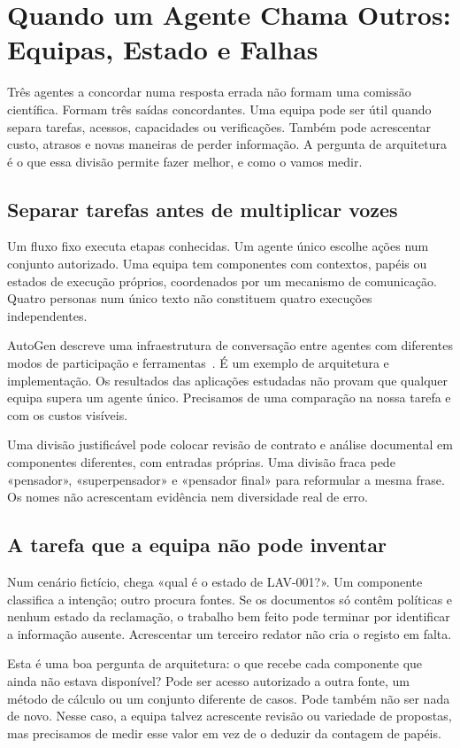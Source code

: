 \chapter{Quando um Agente Chama Outros: Equipas, Estado e Falhas}
\label{ch:multiagente}

Três agentes a concordar numa resposta errada não formam uma comissão científica. Formam três saídas concordantes. Uma equipa pode ser útil quando separa tarefas, acessos, capacidades ou verificações. Também pode acrescentar custo, atrasos e novas maneiras de perder informação. A pergunta de arquitetura é o que essa divisão permite fazer melhor, e como o vamos medir.

\section{Separar tarefas antes de multiplicar vozes}
Um fluxo fixo executa etapas conhecidas. Um agente único escolhe ações num conjunto autorizado. Uma equipa tem componentes com contextos, papéis ou estados de execução próprios, coordenados por um mecanismo de comunicação. Quatro personas num único texto não constituem quatro execuções independentes.

AutoGen descreve uma infraestrutura de conversação entre agentes com diferentes modos de participação e ferramentas~\citep{autogen2023}. É um exemplo de arquitetura e implementação. Os resultados das aplicações estudadas não provam que qualquer equipa supera um agente único. Precisamos de uma comparação na nossa tarefa e com os custos visíveis.

Uma divisão justificável pode colocar revisão de contrato e análise documental em componentes diferentes, com entradas próprias. Uma divisão fraca pede «pensador», «superpensador» e «pensador final» para reformular a mesma frase. Os nomes não acrescentam evidência nem diversidade real de erro.

\section{A tarefa que a equipa não pode inventar}
Num cenário fictício, chega «qual é o estado de LAV-001?». Um componente classifica a intenção; outro procura fontes. Se os documentos só contêm políticas e nenhum estado da reclamação, o trabalho bem feito pode terminar por identificar a informação ausente. Acrescentar um terceiro redator não cria o registo em falta.

Esta é uma boa pergunta de arquitetura: o que recebe cada componente que ainda não estava disponível? Pode ser acesso autorizado a outra fonte, um método de cálculo ou um conjunto diferente de casos. Pode também não ser nada de novo. Nesse caso, a equipa talvez acrescente revisão ou variedade de propostas, mas precisamos de medir esse valor em vez de o deduzir da contagem de papéis.

